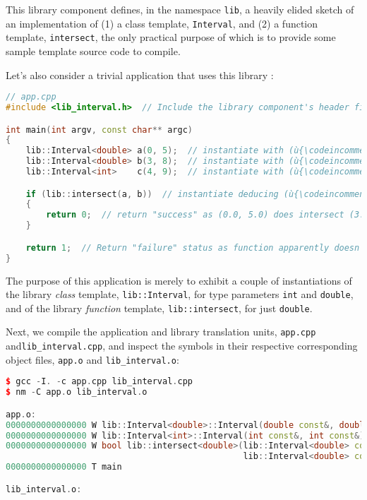\noindent This library component defines, in the namespace \lstinline!lib!, a heavily
elided sketch of an implementation of (1) a class template,
\lstinline!Interval!, and (2) a function template, \lstinline!intersect!, the
only practical purpose of which is to provide some sample template
source code to compile.

Let's also consider a trivial application that uses this library
:

\begin{lstlisting}[language=C++]
// app.cpp
#include <lib_interval.h>  // Include the library component's header file.

int main(int argv, const char** argc)
{
    lib::Interval<double> a(0, 5);  // instantiate with (ù{\codeincomments{double}}ù) type parameter
    lib::Interval<double> b(3, 8);  // instantiate with (ù{\codeincomments{double}}ù) type parameter
    lib::Interval<int>    c(4, 9);  // instantiate with (ù{\codeincomments{int}}ù)    type parameter

    if (lib::intersect(a, b))  // instantiate deducing (ù{\codeincomments{double}}ù) type parameter
    {
        return 0;  // return "success" as (0.0, 5.0) does intersect (3.0, 8.0)
    }

    return 1;  // Return "failure" status as function apparently doesn't work.
}
\end{lstlisting}
    
\noindent The purpose of this application is merely to exhibit a couple of
instantiations of the library \emph{class} template,
\lstinline!lib::Interval!, for type parameters \lstinline!int! and
\lstinline!double!, and of the library \emph{function} template,
\lstinline!lib::intersect!, for just \lstinline!double!.

Next, we compile the application and library translation units,
\lstinline!app.cpp! and\linebreak[4] 
\lstinline!lib_interval.cpp!, and inspect the symbols
in their respective corresponding object files, \lstinline!app.o! and
\lstinline!lib_interval.o!:

\begin{lstlisting}[language=C++]
$ gcc -I. -c app.cpp lib_interval.cpp
$ nm -C app.o lib_interval.o

app.o:
0000000000000000 W lib::Interval<double>::Interval(double const&, double const&)
0000000000000000 W lib::Interval<int>::Interval(int const&, int const&)
0000000000000000 W bool lib::intersect<double>(lib::Interval<double> const&,
                                               lib::Interval<double> const&)
0000000000000000 T main

lib_interval.o:
\end{lstlisting}
    
